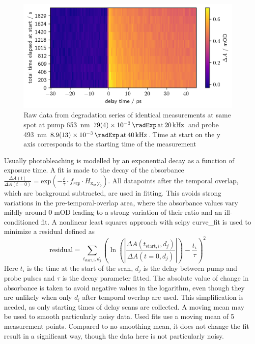 \documentclass[twoside,openright,listof=numbered]{scrreprt}
\def\pumpExp#1{\ensuremath{\SI{#1}{\radExp}\,\mathrm{at}\, \SI{20}{\kilo\hertz}}}
\def\probeExp#1{\ensuremath{\SI{#1}{\radExp}\,\mathrm{at}\, \SI{40}{\kilo\hertz}}}
\def\radiantExp{\ensuremath{H_\mathrm{x_0,y_0}}}
\begin{document}
\begin{figure}[hbtp]
\centering
\includegraphics[width=\linewidth]{images/DegradationRAWPump653Probe493.png}
\caption[Raw data from degradation series of identical measurements at same spot at pump \SI{653}{\nano\meter} and probe \SI{493}{\nano\meter}.]{Raw data from degradation series of identical measurements at same spot at pump \SI{653}{\nano\meter} \pumpExp{79(4)e-3} and probe \SI{493}{\nano\meter} \probeExp{8.9(1.3)e-3}.
Time at start on the y axis corresponds to the starting time of the measurement\label{fig:rawDegradation}}
\end{figure}
Usually photobleaching is modelled by an exponential decay as a function of exposure time. A fit is made to the decay of the absorbance $\frac{\Delta A\left(t\right)}{\Delta A\left(t=0\right)} = \mathrm{exp}\left(-\frac{t}{\tau}\cdot f_{rep}\cdot\radiantExp\right)$.
All datapoints after the temporal overlap, which are background subtracted, are used in fitting. This avoids strong variations in the pre-temporal-overlap area, where the absorbance values vary mildly around 0 mOD leading to a strong variation of their ratio and an ill-conditioned fit. A nonlinear least squares approach with scipy curve\_fit is used to minimize a residual defined as
\begin{equation}\label{eq:degradationFitting}
\mathrm{residual} = \sum_{t_{\text{start},i},d_j} \left(\ln\left(\left\lvert\frac{\Delta A(t_{\text{start},i},d_j)}{\Delta A(t=0,d_j)}\right\rvert\right)- \frac{t_i}{\tau}\right)^2
\end{equation}
Here $t_i$ is the time at the start of the scan, $d_j$ is the delay between pump and probe pulses and $\tau$ is the decay parameter fitted. The absolute value of change in absorbance is taken to avoid negative values in the logarithm, even though they are unlikely when only $d_i$ after temporal overlap are used.  This simplification is needed, as only starting times of delay scans are collected. A moving mean may be used to smooth particularly noisy data. Used fits use a moving mean of 5 measurement points. Compared to no smoothing mean, it does not change the fit result in a significant way, though the data here is not particularly noisy.\\
\end{document}
